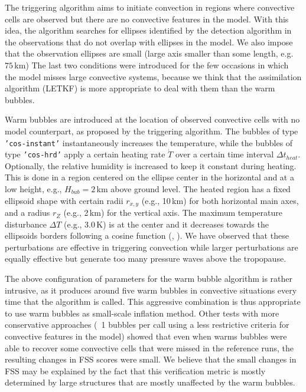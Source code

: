\documentclass[10pt,a4paper,twoside,headinclude,footinclude,parskip=half]{scrartcl}
\newcommand{\citeNPK}[1]{\citeauthor{#1}, \citeyear{#1}}
\newcommand{\srcform}[1]{\mbox{\texttt{#1}}\xspace}%
\begin{document}
The triggering algorithm aims to initiate convection in regions where convective cells are observed but
there are no convective features in the model. With this idea, the algorithm searches for ellipses
identified by the detection algorithm in the observations that do not overlap with ellipses in the model.
We also impose that the observation ellipses are small (large axis smaller than some length, e.g. $75\,$km)
The last two conditions were introduced for the few occasions in which the model misses large
convective systems, because we think that the assimilation algorithm (LETKF) is more appropriate
to deal with them than the warm bubbles.

Warm bubbles are introduced at the location of observed convective cells with no model counterpart,
as proposed by the triggering algorithm. The bubbles of type \srcform{'cos-instant'} instantaneously increases
the temperature, while the bubbles of type \srcform{'cos-hrd'} apply a certain heating
rate $\dot{T}$ over a certain time interval $\Delta t_{heat}$. Optionally, the relative humidity is increased to keep it constant during heating.
This is done in a region centered on the ellipse center
in the horizontal and at a low height, e.g., $H_{bub}=2\,$km above ground level.
The heated region has a fixed ellipsoid shape with certain radii $r_{x,y}$ (e.g., 10\,km) for both horizontal main axes,
and a radius $r_Z$ (e.g., 2\,km) for the vertical axis.  The maximum temperature disturbance $\Delta T$ (e.g., 3.0\,K)
is at the center and it decreases towards the ellipsoids borders following a cosine function (\citeNPK{weisman1982}).
We have observed that these perturbations are effective in triggering convection while larger
perturbations are equally effective but generate too many pressure waves above the tropopause.

The above configuration of parameters for the warm bubble algorithm is rather intrusive,
as it produces around five warm bubbles in convective situations every time that the algorithm is called. 
This aggressive combination is thus appropriate to use warm bubbles as small-scale inflation method.
Other tests with more conservative approaches (~1 bubbles per call using a less restrictive criteria
for convective features in the model) showed that even when warms bubbles were able to recover some
convective cells that were missed in the reference runs, the resulting changes in FSS scores were small.
We believe that the small changes in FSS may be explained by the fact that this verification metric is
mostly determined by large structures that are mostly unaffected by the warm bubbles. 
\end{document}
